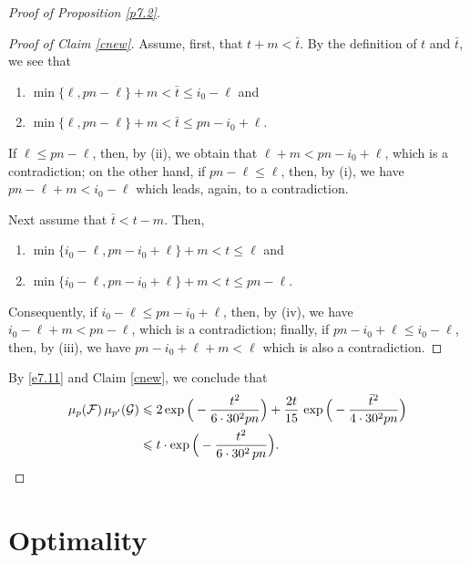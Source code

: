 \documentclass[10pt]{amsart}
\theoremstyle{remark}
\newcommand{\mik}{\leqslant}
\newcommand{\Fcal}{\mathcal{F}}
\newcommand{\Gcal}{\mathcal{G}}
\begin{document}
\begin{proof}[Proof of Proposition \emph{\ref{p7.2}}]
\begin{proof}[Proof of Claim \emph{\ref{cnew}}]
Assume, first, that $t+m<\bar{t}$. By the definition of $t$ and $\bar{t}$, we see that
\begin{enumerate}
\item[(i)] $\min\{\ell, pn-\ell\} +m < \bar{t} \mik i_0-\ell$ and
\item[(ii)] $\min\{\ell, pn-\ell\} +m < \bar{t} \mik pn-i_0+\ell$.
\end{enumerate}
If $\ell\mik pn-\ell$, then, by (ii), we obtain that $\ell+m<pn-i_0+\ell$, which is a contradiction; on the other hand,
if $pn-\ell\mik \ell$, then, by (i), we have $pn-\ell+m<i_0-\ell$ which leads, again, to a contradiction.

Next assume that $\bar{t}<t-m$. Then,
\begin{enumerate}
\item[(iii)] $\min\{i_0-\ell, pn-i_0+\ell\} +m < t\mik \ell$ and
\item[(iv)] $\min\{i_0-\ell, pn-i_0+\ell\} +m  < t \mik pn-\ell$.
\end{enumerate}
Consequently, if $i_0-\ell\mik pn-i_0+\ell$, then, by (iv), we have $i_0-\ell+m< pn-\ell$, which is a contradiction;
finally, if $pn-i_0+\ell\mik i_0-\ell$, then, by (iii), we have $pn-i_0+\ell+m<\ell$ which is also a contradiction.
\end{proof}
By \eqref{e7.11} and Claim \ref{cnew}, we conclude that
\begin{align}
\label{e7.12} \mu_p(\Fcal)\, \mu_{p'}(\Gcal) & \mik 2\exp\Big(- \frac{t^2}{6\cdot 30^2pn}\Big) +
\frac{2t}{15}\,  \exp\Big(- \frac{\bar{t}^2}{4\cdot 30^2 pn}\Big) \\
& \mik t\cdot \exp\Big( - \frac{t^2}{6\cdot 30^2\, pn}\Big). \nonumber \qedhere
\end{align}
\end{proof}


\section{Optimality} \label{sec8}

\end{document}
